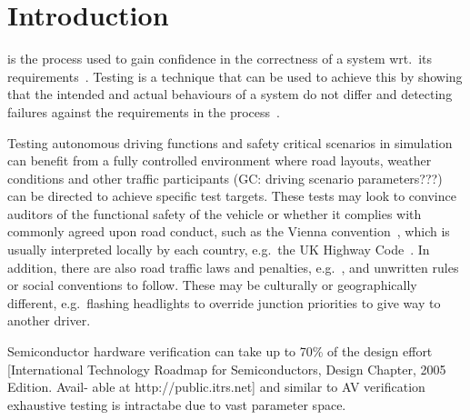 \documentclass[letterpaper, 10 pt, journal, twoside]{IEEEtran}
\begin{document}
\section{Introduction}

 is the process used to gain confidence in the correctness of a system wrt.\ its requirements~\cite{bergeron???}. Testing is a technique that can be used to achieve this by showing that the intended and actual behaviours of a system do not differ and detecting failures against the requirements in the process~\cite{utting2012taxonomy}.




Testing autonomous driving functions and safety critical scenarios in simulation can benefit from a fully controlled environment where road layouts, weather conditions and other traffic participants (GC: driving scenario parameters???) can be directed to achieve specific test targets. These tests may look to convince auditors of the functional safety of the vehicle or whether it complies with commonly agreed upon road conduct, such as the Vienna convention~\cite{ViennaConv}, which is usually interpreted locally by each country, e.g.\ the UK Highway Code~\cite{codes2011highway}. In addition, there are also road traffic laws and penalties, e.g.~\cite{RoadTraffic1988}, and unwritten rules or social conventions to follow. These may be culturally or geographically different, e.g.\ flashing headlights to override junction priorities to give way to another driver.


Semiconductor hardware verification can take up to 70\% of the design effort [International Technology Roadmap for Semiconductors, Design Chapter, 2005 Edition. Avail- able at http://public.itrs.net] and similar to AV verification exhaustive testing is intractabe due to vast parameter space.
\end{document}
